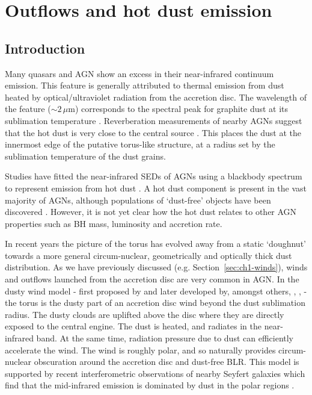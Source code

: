 
\chapter{Outflows and hot dust emission}
\label{ch:sed} 



\section{Introduction}

Many quasars and AGN show an excess in their near-infrared continuum emission. 
This feature is generally attributed to thermal emission from dust heated by optical/ultraviolet radiation from the accretion disc. 
The wavelength of the feature ($\sim2$\,$\mu$m) corresponds to the spectral peak for graphite dust at its sublimation temperature \citep[${\mathrm T}\sim1500$\,K;][]{barvainis87}. 
Reverberation measurements of nearby AGNs suggest that the hot dust is very close to the central source \citep[few tens of light days; e.g.][]{minezaki04,suganuma06}.
This places the dust at the innermost edge of the putative torus-like structure, at a radius set by the sublimation temperature of the dust grains.  

Studies have fitted the near-infrared SEDs of AGNs using a blackbody spectrum to represent emission from hot dust \citep[e.g.][]{edelson86,barvainis87,kishimoto07,mor09,riffel09,deo11,landt11,mor11,roseboom13}. 
A hot dust component is present in the vast majority of AGNs, although populations of `dust-free' objects have been discovered \citep{hao10,hao11,jiang10,mor11}. 
However, it is not yet clear how the hot dust relates to other AGN properties such as BH mass, luminosity and accretion rate. 

In recent years the picture of the torus has evolved away from a static `doughnut' towards a more general circum-nuclear, geometrically and optically thick dust distribution. 
As we have previously discussed (e.g. Section~\ref{sec:ch1-winds}), winds and outflows launched from the accretion disc are very common in AGN. 
In the dusty wind model - first proposed by \citet{konigl94} and later developed by, amongst others, \citet{everett05}, \citet{elitzur06}, \citet{keating12} - the torus is the dusty part of an accretion disc wind beyond the dust sublimation radius.  
The dusty clouds are uplifted above the disc where they are directly exposed to the central engine. 
The dust is heated, and radiates in the near-infrared band.
At the same time, radiation pressure due to dust can efficiently accelerate the wind. 
The wind is roughly polar, and so naturally provides circum-nuclear obscuration around the accretion disc and dust-free BLR.   
This model is supported by recent interferometric observations of nearby Seyfert galaxies which find that the mid-infrared emission is dominated by dust in the polar regions \citep[e.g.][]{honig12,honig13}.  

